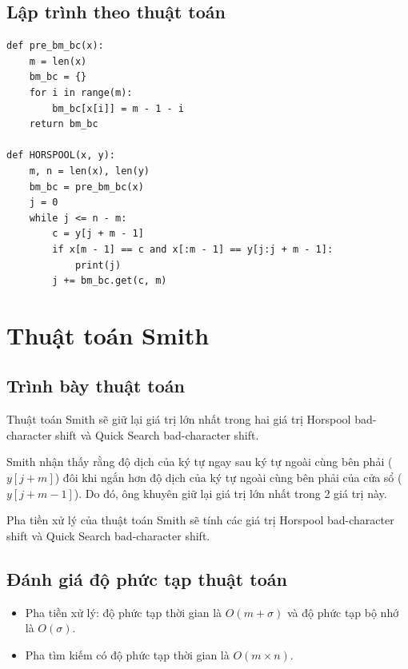 \documentclass[12pt,twoside,openright]{extreport}
\begin{document}
\subsection{Lập trình theo thuật toán}

\begin{lstlisting}[style=PythonStyle]
def pre_bm_bc(x):
    m = len(x)
    bm_bc = {}
    for i in range(m):
        bm_bc[x[i]] = m - 1 - i
    return bm_bc

def HORSPOOL(x, y):
    m, n = len(x), len(y)
    bm_bc = pre_bm_bc(x)
    j = 0
    while j <= n - m:
        c = y[j + m - 1]
        if x[m - 1] == c and x[:m - 1] == y[j:j + m - 1]:
            print(j)
        j += bm_bc.get(c, m)
\end{lstlisting}

\section{Thuật toán Smith}

\subsection{Trình bày thuật toán}

Thuật toán Smith sẽ giữ lại giá trị lớn nhất trong hai giá trị Horspool bad-character shift và Quick Search bad-character shift.

Smith nhận thấy rằng độ dịch của ký tự ngay sau ký tự ngoài cùng bên phải ($y[j+m]$) đôi khi ngắn hơn độ dịch của ký tự ngoài cùng bên phải của cửa sổ ($y[j+m-1]$). Do đó, ông khuyên giữ lại giá trị lớn nhất trong 2 giá trị này.

Pha tiền xử lý của thuật toán Smith sẽ tính các giá trị Horspool bad-character shift và Quick Search bad-character shift.

\subsection{Đánh giá độ phức tạp thuật toán}

\begin{itemize}
	\item Pha tiền xử lý: độ phức tạp thời gian là $O(m + \sigma)$ và độ phức tạp bộ nhớ là $O(\sigma)$.
	\item Pha tìm kiếm có độ phức tạp thời gian là $O(m \times n)$.
\end{itemize}
\end{document}

